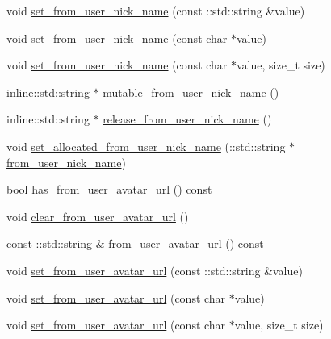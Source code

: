 \begin{DoxyCompactItemize}
void \hyperlink{class_i_m_1_1_base_define_1_1_server_msg_info_a2f83b5d277823db805455870fed72663}{set\+\_\+from\+\_\+user\+\_\+nick\+\_\+name} (const \+::std\+::string \&value)
\item 
void \hyperlink{class_i_m_1_1_base_define_1_1_server_msg_info_abb487728a358b5071d0886fa4552d85d}{set\+\_\+from\+\_\+user\+\_\+nick\+\_\+name} (const char $\ast$value)
\item 
void \hyperlink{class_i_m_1_1_base_define_1_1_server_msg_info_a0968030f37236c5bd3f2300ea327b583}{set\+\_\+from\+\_\+user\+\_\+nick\+\_\+name} (const char $\ast$value, size\+\_\+t size)
\item 
inline\+::std\+::string $\ast$ \hyperlink{class_i_m_1_1_base_define_1_1_server_msg_info_aa8ff642700afca560cca329ca51611e4}{mutable\+\_\+from\+\_\+user\+\_\+nick\+\_\+name} ()
\item 
inline\+::std\+::string $\ast$ \hyperlink{class_i_m_1_1_base_define_1_1_server_msg_info_a23cad6f1c302470121f45f0851ce8e43}{release\+\_\+from\+\_\+user\+\_\+nick\+\_\+name} ()
\item 
void \hyperlink{class_i_m_1_1_base_define_1_1_server_msg_info_ae51340e9328ec32897dae69d450cfdbd}{set\+\_\+allocated\+\_\+from\+\_\+user\+\_\+nick\+\_\+name} (\+::std\+::string $\ast$\hyperlink{class_i_m_1_1_base_define_1_1_server_msg_info_a065590708d0f177fdee8bc1076c75465}{from\+\_\+user\+\_\+nick\+\_\+name})
\item 
bool \hyperlink{class_i_m_1_1_base_define_1_1_server_msg_info_a305e1ed9a388002f7e25d306ab719e83}{has\+\_\+from\+\_\+user\+\_\+avatar\+\_\+url} () const 
\item 
void \hyperlink{class_i_m_1_1_base_define_1_1_server_msg_info_a75fcab8d63f1a99f2d1d3b72ffe9f567}{clear\+\_\+from\+\_\+user\+\_\+avatar\+\_\+url} ()
\item 
const \+::std\+::string \& \hyperlink{class_i_m_1_1_base_define_1_1_server_msg_info_a15a09da50055edc710edfe9432d5f25f}{from\+\_\+user\+\_\+avatar\+\_\+url} () const 
\item 
void \hyperlink{class_i_m_1_1_base_define_1_1_server_msg_info_a399d60e62c8699cf9cd9951c70b54bfa}{set\+\_\+from\+\_\+user\+\_\+avatar\+\_\+url} (const \+::std\+::string \&value)
\item 
void \hyperlink{class_i_m_1_1_base_define_1_1_server_msg_info_a60a149a3d040085077b3d9dc909d0df6}{set\+\_\+from\+\_\+user\+\_\+avatar\+\_\+url} (const char $\ast$value)
\item 
void \hyperlink{class_i_m_1_1_base_define_1_1_server_msg_info_ae09bc71d7a2950914b84b9670051ea99}{set\+\_\+from\+\_\+user\+\_\+avatar\+\_\+url} (const char $\ast$value, size\+\_\+t size)

\end{DoxyCompactItemize}
